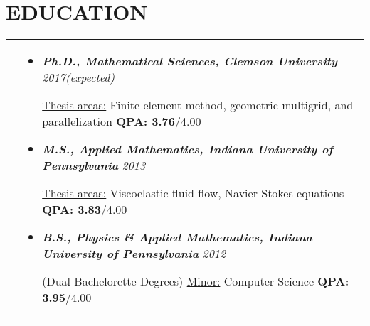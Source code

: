 \documentclass[10pt]{article}
\begin{document}
\section{\textbf{EDUCATION}}
\vspace*{-\baselineskip}
\hskip-1.7in
\begin{tabularx}{1.5\linewidth}{>{\raggedleft\scshape}p{3cm}X}
  &\begin{itemize}
    \setlength\itemsep{.005em}
  \item \textbf{\textit{Ph.D., Mathematical Sciences, Clemson University}}  \hspace{44 mm} \textit{2017(expected)}
  
            \underline{Thesis areas:} Finite element method, geometric multigrid, and parallelization \hspace{16.5mm} \textbf{QPA: 3.76}/4.00
             
\item \textbf{\textit{M.S., Applied Mathematics, Indiana University of Pennsylvania}} \hspace{20.5 mm} \textit{2013}
  
             \underline{Thesis areas:} Viscoelastic fluid flow, Navier Stokes equations \hspace{42mm} \textbf{QPA: 3.83}/4.00
             
\item \textbf{\textit{B.S., Physics \& Applied Mathematics, Indiana University of Pennsylvania}} \hspace{3 mm}\textit{2012}
  
             (Dual Bachelorette Degrees) \underline{Minor:} Computer Science \hspace{51.5mm} \textbf{QPA: 3.95}/4.00
             
  \end{itemize} 

\end{tabularx}
\end{document}
